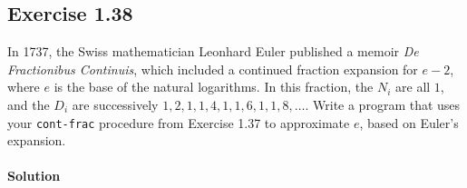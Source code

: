 \subsection*{Exercise 1.38}
In 1737, the Swiss mathematician Leonhard Euler published a memoir \textit{De Fractionibus Continuis}, which
included a continued fraction expansion for $ e - 2 $, where $ e $ is the base of the natural logarithms.
In this fraction, the $ N_{i} $ are all $ 1 $, and the $ D_{i} $ are successively $ 1, 2, 1, 1, 4, 1, 1, 6, 1, 1, 8, \dots $.
Write a program that uses your \texttt{cont-frac} procedure from Exercise 1.37 to approximate $ e $, based on Euler's expansion.

\paragraph{Solution}